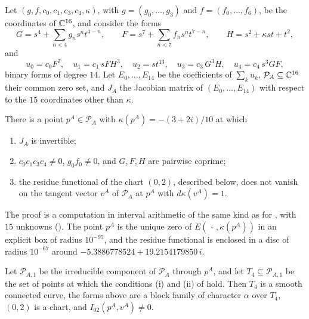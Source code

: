 Let $(g,f,c_{0},c_{1},c_{3},c_{4},\kappa)$, with $g=(g_{0},\dots,g_{3})$ and
$f=(f_{0},\dots,f_{6})$, be the coordinates of $\mathbb{C}^{16}$, and consider the
forms
\[
  G=s^{4}+\sum_{n<4}g_{n}s^{n}t^{4-n},\qquad F=s^{7}+\sum_{n<7}f_{n}s^{n}
  t^{7-n},\qquad H=s^{2}+\kappa st+t^{2},
\]
and
\[
  u_{0}=c_{0}F^{2},\quad u_{1}=c_{1}\,sFH^{3},\quad u_{2}=st^{13},\quad
  u_{3}=c_{3}\,G^{3}H,\quad u_{4}=c_{4}\,s^{3}GF,
\]
binary forms of degree $14$. Let $E_{0},\dots,E_{14}$ be the coefficients
of $\sum_{k}u_{k}$, $\mathcal P_{A}\subseteq\mathbb{C}^{16}$ their common zero set,
and $J_{A}$ the Jacobian matrix of $(E_{0},\dots,E_{14})$ with respect to
the $15$ coordinates other than $\kappa$.

\begin{proposition}\label{prop:family52a}
There is a point $p^{A}\in\mathcal P_{A}$ with $\kappa(p^{A})=-(3+2i)/10$ at
which
\begin{enumerate}[label=\textup{(\roman*)}]
\item $J_{A}$ is invertible;
\item $c_{0}c_{1}c_{3}c_{4}\ne0$, $g_{0}f_{0}\ne0$, and $G,F,H$ are
pairwise coprime;
\item the residue functional of the chart $(0,2)$, described below, does
not vanish on the tangent vector $v^{A}$ of $\mathcal P_{A}$ at $p^{A}$ with
$d\kappa(v^{A})=1$.
\end{enumerate}
\end{proposition}

The proof is a computation in interval arithmetic of the same kind as for
, with $15$ unknowns (). The point
$p^{A}$ is the unique zero of $E(\,\cdot\,,\kappa(p^{A}))$ in an explicit
box of radius $10^{-95}$, and the residue functional is enclosed in a disc
of radius $10^{-67}$ around $-5.3886778524+19.2154179850\,i$.

\begin{corollary}\label{cor:family52a}
Let $\mathcal P_{A,1}$ be the irreducible component of $\mathcal P_{A}$
through $p^{A}$, and let $T_{4}\subseteq\mathcal P_{A,1}$ be the set of
points at which the conditions \textup{(i)} and \textup{(ii)} of
 hold. Then $T_{4}$ is a smooth connected curve, the
forms above are a block family of character $\alpha$ over $T_{4}$, $(0,2)$
is a chart, and $I_{02}(p^{A},v^{A})\ne0$.
\end{corollary}

